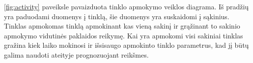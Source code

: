 \ref{fig:activity} paveiksle pavaizduota tinklo apmokymo veiklos diagrama. Iš pradžių yra paduodami duomenys į tinklą, šie duomenys yra suskaidomi į sąkinius. Tinklas apmokomas tinklą apmokinant kas vieną sakinį ir grąžinant to sakinio apmokymo vidutinės paklaidos reikymę. Kai yra apmokomi visi sakiniai tinklas gražina kiek laiko mokinosi ir išsisaugo apmokinto tinklo parametrus, kad jį būtų galima naudoti ateityje prognozuojant reikšmes.
